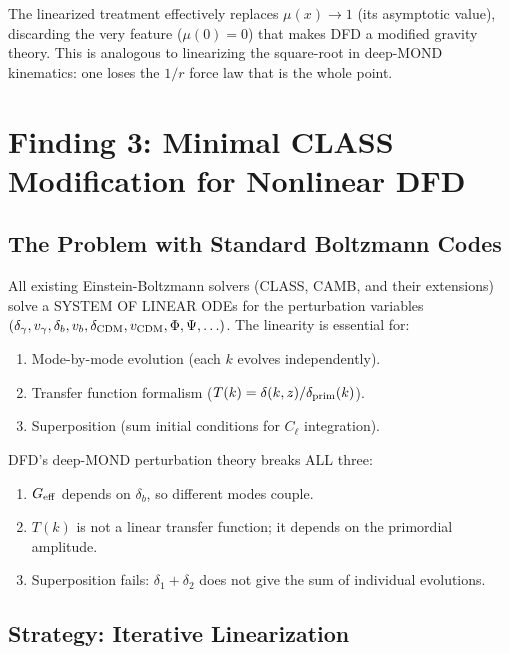 \documentclass[11pt]{article}
\theoremstyle{definition}
\theoremstyle{remark}
\newcommand{\Geff}{G_{\rm eff}}
\begin{document}
The linearized treatment effectively replaces $\mu(x) \to 1$ (its
asymptotic value), discarding the very feature ($\mu(0) = 0$) that
makes DFD a modified gravity theory. This is analogous to linearizing
the square-root in deep-MOND kinematics: one loses the $1/r$ force law
that is the whole point.


\section{Finding 3: Minimal CLASS Modification for Nonlinear DFD}
\label{sec:code}

\subsection{The Problem with Standard Boltzmann Codes}

All existing Einstein-Boltzmann solvers (CLASS, CAMB, and their
extensions) solve a SYSTEM OF LINEAR ODEs for the perturbation
variables $(\delta_\gamma, v_\gamma, \delta_b, v_b, \delta_{\rm CDM},
v_{\rm CDM}, \Phi, \Psi, \ldots)$. The linearity is essential for:
\begin{enumerate}
\item Mode-by-mode evolution (each $k$ evolves independently).
\item Transfer function formalism ($T(k) = \delta(k,z)/\delta_{\rm prim}(k)$).
\item Superposition (sum initial conditions for $C_\ell$ integration).
\end{enumerate}

DFD's deep-MOND perturbation theory breaks ALL three:
\begin{enumerate}
\item $\Geff$ depends on $\delta_b$, so different modes couple.
\item $T(k)$ is not a linear transfer function; it depends on
  the primordial amplitude.
\item Superposition fails: $\delta_1 + \delta_2$ does not give
  the sum of individual evolutions.
\end{enumerate}

\subsection{Strategy: Iterative Linearization}
\end{document}
